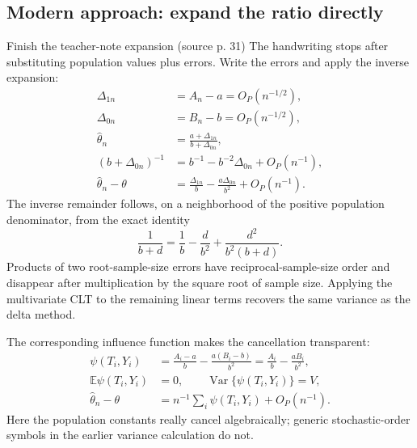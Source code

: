 \documentclass[12pt]{article}
\newcommand{\E}{\mathbb E}
\DeclareMathOperator{\Var}{Var}
\begin{document}
\subsection{Modern approach: expand the ratio directly}
\begin{todobox}{Finish the teacher-note expansion (source p. 31)}
The handwriting stops after substituting population values plus errors.
Write the errors and apply the inverse expansion:
\begin{align}
 \Delta_{1n}&=A_n-a=O_P(n^{-1/2}),\\
 \Delta_{0n}&=B_n-b=O_P(n^{-1/2}),\\
 \widehat\theta_n
 &=\frac{a+\Delta_{1n}}{b+\Delta_{0n}},\\
 (b+\Delta_{0n})^{-1}
 &=b^{-1}-b^{-2}\Delta_{0n}+O_P(n^{-1}),\\
 \widehat\theta_n-\theta
 &=\frac{\Delta_{1n}}b-\frac{a\Delta_{0n}}{b^2}+O_P(n^{-1}).
\end{align}
The inverse remainder follows, on a neighborhood of the positive
population denominator, from the exact identity
\begin{equation}
 \frac1{b+d}=\frac1b-\frac{d}{b^2}+\frac{d^2}{b^2(b+d)}.
\end{equation}
Products of two root-sample-size errors have reciprocal-sample-size
order and disappear after multiplication by the square root of sample
size. Applying the multivariate CLT to the remaining linear terms recovers
the same variance as the delta method.
\end{todobox}
The corresponding influence function makes the cancellation transparent:
\begin{align}
 \psi(T_i,Y_i)&=\frac{A_i-a}{b}-\frac{a(B_i-b)}{b^2}
              =\frac{A_i}{b}-\frac{aB_i}{b^2},\\
 \E\psi(T_i,Y_i)&=0,\qquad \Var\{\psi(T_i,Y_i)\}=V,\\
 \widehat\theta_n-\theta&=n^{-1}\sum_i\psi(T_i,Y_i)+O_P(n^{-1}).
\end{align}
Here the population constants really cancel algebraically; generic
stochastic-order symbols in the earlier variance calculation do not.
\end{document}
